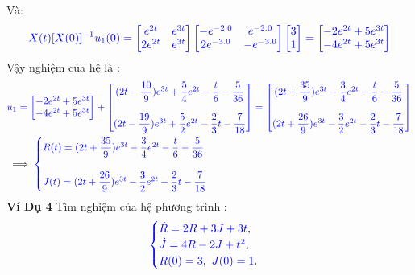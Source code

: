 \documentclass[a4paper]{article}
\begin{document}
 Và: 
 \begin{align}
 \textcolor{blue}{X(t)[X(0)]^{-1}u_1(0)=\begin{bmatrix} e^{2t} & e^{3t}\\ 2e^{2t} & e^{3t} \end{bmatrix}\begin{bmatrix} 
 -e^{-2.0} & e^{-2.0}\\ 2e^{-3.0} & -e^{-3.0} \end{bmatrix} \begin{bmatrix} 3 \\ 1 \end{bmatrix} = \begin{bmatrix} -2e^{2t} + 5e^{3t}\\ -4e^{2t} +5e^{3t} \end{bmatrix}}
 \end{align}
 Vậy nghiệm của hệ là :
 \begin{align}
  & \textcolor{blue}{  u_1=\begin{bmatrix} -2e^{2t} + 5e^{3t}\\ -4e^{2t} +5e^{3t} \end{bmatrix}+\begin{bmatrix} (2t-\dfrac{10}{9})e^{3t}+\dfrac{5}{4}e^{2t} -\dfrac{t}{6}-\dfrac{5}{36}  \\\\ (2t-\dfrac{19}{9})e^{3t}+\dfrac{5}{2}e^{2t}- \dfrac{2}{3}t-\dfrac{7}{18}\end{bmatrix}=\begin{bmatrix} (2t+\dfrac{35}{9})e^{3t}-\dfrac{3}{4}e^{2t} -\dfrac{t}{6}-\dfrac{5}{36}  \\\\ (2t+\dfrac{26}{9})e^{3t}-\dfrac{3}{2}e^{2t}- \dfrac{2}{3}t-\dfrac{7}{18}\end{bmatrix}}\\
 &\implies\textcolor{blue}{  \begin{cases}
     \textcolor{blue}
{R(t)=(2t+\dfrac{35}{9})e^{3t}-\dfrac{3}{4}e^{2t} -\dfrac{t}{6}-\dfrac{5}{36} }\\\\\textcolor{blue}
{J(t)=(2t+\dfrac{26}{9})e^{3t}-\dfrac{3}{2}e^{2t}- \dfrac{2}{3}t-\dfrac{7}{18}}
\end{cases}}
 \end{align}
 \textbf{Ví Dụ 4}
Tìm nghiệm của hệ phương trình :
 \begin{align}
	    \textcolor{blue}{
	    \begin{cases}
            \dot R = 2R +3J + 3t \textcolor{black}{,}\\
            \dot J = 4R - 2J +  t^{2} \textcolor{black}{,}\\
            R(0) = 3\textcolor{black}{,} \enskip J(0) = 1 \textcolor{black}{.}
        \end{cases}
        }
        \label{label9}
	\end{align}\\
\end{document}
